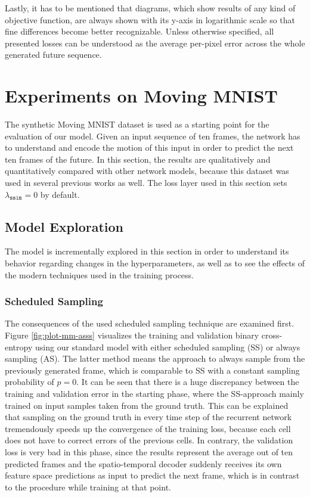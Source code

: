 Lastly, it has to be mentioned that diagrams, which show results of any kind of objective function, are always shown with its y-axis in logarithmic scale so that fine differences become better recognizable. Unless otherwise specified, all presented losses can be understood as the average per-pixel error across the whole generated future sequence.

\section{Experiments on Moving MNIST} \label{sec:exp-mm}

The synthetic Moving MNIST dataset is used as a starting point for the evaluation of our model. Given an input sequence of ten frames, the network has to understand and encode the motion of this input in order to predict the next ten frames of the future. In this section, the results are qualitatively and quantitatively compared with other network models, because this dataset was used in several previous works as well. The loss layer used in this section sets $ \lambda_{\texttt{ssim}} = 0 $ by default.

\subsection{Model Exploration}

The model is incrementally explored in this section in order to understand its behavior regarding changes in the hyperparameters, as well as to see the effects of the modern techniques used in the training process.

\subsubsection*{Scheduled Sampling}

The consequences of the used scheduled sampling technique are examined first. Figure \ref{fig:plot-mm-asss} visualizes the training and validation binary cross-entropy using our standard model with either scheduled sampling (SS) or always sampling (AS). The latter method means the approach to always sample from the previously generated frame, which is comparable to SS with a constant sampling probability of $p=0$. It can be seen that there is a huge discrepancy between the training and validation error in the starting phase, where the SS-approach mainly trained on input samples taken from the ground truth. This can be explained that sampling on the ground truth in every time step of the recurrent network tremendously speeds up the convergence of the training loss, because each cell does not have to correct errors of the previous cells. In contrary, the validation loss is very bad in this phase, since the results represent the average out of ten predicted frames and the spatio-temporal decoder suddenly receives its own feature space predictions as input to predict the next frame, which is in contrast to the procedure while training at that point.


